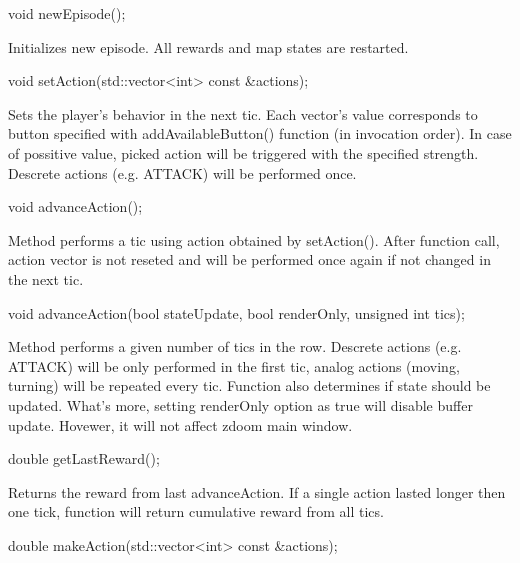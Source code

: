 \vspace{20pt}
\begin{clinee}
void newEpisode();
\end{clinee}

Initializes new episode. All rewards and map states are restarted.


\vspace{20pt}
\begin{clinee}
	void setAction(std::vector<int> const &actions);
\end{clinee}

Sets the player's behavior in the next tic.
Each vector's value corresponds to button specified with addAvailableButton() function (in invocation order).
In case of possitive value, picked action will be triggered with the specified strength. Descrete actions (e.g. ATTACK) will be performed once.


\vspace{20pt}
\begin{clinee}
	void advanceAction();
\end{clinee}

Method performs a tic using action obtained by setAction(). After function call, action vector is not reseted and will be performed once again if not changed in the next tic.


\vspace{20pt}
\begin{clinee}
	void advanceAction(bool stateUpdate, bool renderOnly, unsigned int tics);
\end{clinee}

Method performs a given number of tics in the row. Descrete actions (e.g. ATTACK) will be only performed in the first tic, analog actions (moving, turning) will be repeated every tic. 
Function also determines if state should be updated. What's more, setting renderOnly option as true will disable buffer update. Hovewer, it will not affect zdoom main window.  


\vspace{20pt}
\begin{clinee}
	double getLastReward();
\end{clinee}

Returns the reward from last advanceAction. If a single action lasted longer then one tick, function will return cumulative reward from all tics.


\vspace{20pt}
\begin{clinee}
	double makeAction(std::vector<int> const &actions);
\end{clinee}

